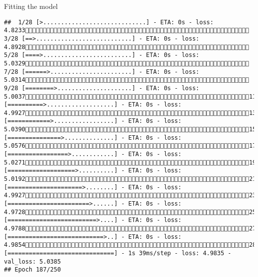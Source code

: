 \documentclass[
  ignorenonframetext,
]{beamer}
\begin{document}
\begin{frame}[fragile]{Fitting the model}
\begin{verbatim}
##  1/28 [>.............................] - ETA: 0s - loss: 4.8233 3/28 [==>...........................] - ETA: 0s - loss: 4.8928 5/28 [====>.........................] - ETA: 0s - loss: 5.0329 7/28 [======>.......................] - ETA: 0s - loss: 5.0314 9/28 [========>.....................] - ETA: 0s - loss: 5.003711/28 [==========>...................] - ETA: 0s - loss: 4.992713/28 [============>.................] - ETA: 0s - loss: 5.039015/28 [===============>..............] - ETA: 0s - loss: 5.057617/28 [=================>............] - ETA: 0s - loss: 5.027119/28 [===================>..........] - ETA: 0s - loss: 5.019221/28 [=====================>........] - ETA: 0s - loss: 4.992723/28 [=======================>......] - ETA: 0s - loss: 4.972825/28 [=========================>....] - ETA: 0s - loss: 4.978827/28 [===========================>..] - ETA: 0s - loss: 4.985428/28 [==============================] - 1s 39ms/step - loss: 4.9835 - val_loss: 5.0385
## Epoch 187/250

\end{verbatim}
\end{frame}
\end{document}
